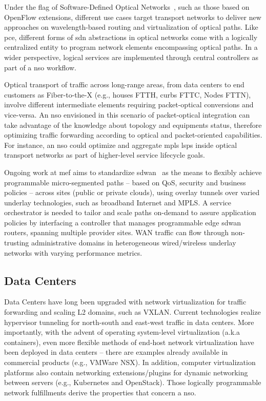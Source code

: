 Under the flag of Software-Defined Optical Networks~\cite{7503119}, such as those based on OpenFlow extensions, different use cases target transport networks to deliver new approaches on wavelength-based routing and virtualization of optical paths.  Like \gls{pce}, different forms of \gls{sdn} abstractions in optical networks come with a logically centralized entity to program network elements encompassing optical paths. In a wider perspective, logical services are implemented through central controllers as part of a \gls{nso} workflow.

Optical transport of traffic across long-range areas, from data centers to end customers as Fiber-to-the-X (e.g., houses FTTH, curbs FTTC, Nodes FTTN), involve  different intermediate elements requiring packet-optical conversions and vice-versa. An \gls{nso} envisioned in this scenario of packet-optical integration can take advantage of the knowledge about topology and equipments status, therefore optimizing traffic forwarding according to optical and packet-oriented capabilities. For instance, an \gls{nso} could optimize and aggregate \gls{mpls} \glspl{lsp} inside optical transport networks as part of higher-level service lifecycle goals.

Ongoing work at \gls{mef} aims to standardize \gls{sdwan}~\cite{MEF:SDWAN:2017}  as the means to flexibly achieve programmable micro-segmented paths -- based on QoS, security and business policies -- across sites (public or private clouds), using overlay tunnels over varied underlay technologies, such as broadband Internet and MPLS. A service orchestrator is needed to  tailor and scale paths on-demand to assure application policies by interfacing a controller that manages programmable edge \gls{sdwan} routers, spanning multiple provider sites. WAN traffic can flow through non-trusting administrative domains in heterogeneous wired/wireless underlay networks with varying performance metrics.

\subsection{Data Centers}

Data Centers have long been upgraded with network virtualization for traffic forwarding and scaling L2 domains, such as VXLAN. Current technologies realize hypervisor tunneling for north-south and east-west traffic in data centers. More importantly, with the advent of operating system-level virtualization (a.k.a containers), even more flexible methods of end-host network virtualization have been deployed in data centers -- there are examples already available in commercial products (e.g., VMWare NSX). In addition, computer virtualization platforms also contain networking extensions/plugins for dynamic networking between servers (e.g., Kubernetes and OpenStack). Those logically programmable network fulfillments derive the properties that concern a \gls{nso}.

